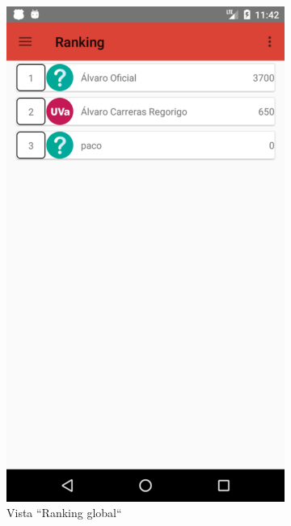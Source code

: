\documentclass[twoside]{report}
\begin{document}
\begin{figure}[H]
\begin{center}
\begin{subfigure}[t]{.3\linewidth}
		\includegraphics[scale=0.2]{images/userguide/12.png}
		\caption{Vista “Ranking global“}
	\end{subfigure}\hspace{2mm}%
	\begin{subfigure}[t]{.3\linewidth}

\end{subfigure}
\end{center}
\end{figure}
\end{document}
